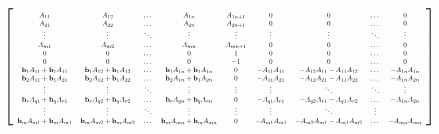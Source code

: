 $\left[
\scalebox{0.5}{%
	\begin{tabular}{ c c c c c c c c c}
	$A_{11}$ & $A_{12}$ & $\dots$ & $A_{1n}$ & $A_{1n+1}$ & $0$ & $0$ & $\dots$ & $0$ \\ 
	$A_{21}$ & $A_{22}$ & $\dots$ & $A_{2n}$ & $A_{2n+1}$ & $0$ & $0$ & $\dots$ & $0$ \\  
	$\vdots$ & $\vdots$ & $\ddots$ & $\vdots$ & $\vdots$ & $\vdots$ & $\vdots$ & $\ddots$ & $\vdots$\\
	$A_{m1}$ & $A_{m2}$ & $\dots$ & $A_{mn}$ & $A_{mn+1}$ & $0$ & $0$ & $\dots$ & $0$ \\
	$0$ & $0$ & $\dots$ & $0$ & $1$ & $0$ & $0$ & $\dots$ & $0$ \\
	$0$ & $0$ & $\dots$ & $0$ & $-1$ & $0$ & $0$ & $\dots$ & $0$ \\
	$\vb_1A_{11}+\vb_1A_{11}$ & $\vb_1A_{12}+\vb_1A_{12}$ & $\dots$ & $\vb_1A_{1n}+\vb_1A_{1n}$ & $0$ & $-A_{11}A_{11}$ & $-A_{12}A_{11}-A_{11}A_{12}$ & $\dots$ & $-A_{1n}A_{1n}$ \\ 
	$\vb_2A_{11}+\vb_1A_{21}$ & $\vb_2A_{12}+\vb_1A_{22}$ & $\dots$ & $\vb_2A_{1n}+\vb_1A_{2n}$ & $0$ & $-A_{11}A_{21}$ & $-A_{12}A_{21}-A_{11}A_{22}$ & $\dots$ & $-A_{1n}A_{2n}$ \\ 
	$\vdots$ & $\vdots$ & $\ddots$ & $\vdots$ & $\vdots$ & $\vdots$ & $\ddots$ & $\ddots$ & $\vdots$\\
	$\vb_rA_{q1}+\vb_qA_{r1}$ & $\vb_rA_{q2}+\vb_qA_{r2}$ & $\dots$ & $\vb_rA_{qn}+\vb_qA_{rn}$ & $0$ &$-A_{q1}A_{r1}$ & $-A_{q2}A_{r1}-A_{q1}A_{r2}$ & $\dots$ & $-A_{1n}A_{2n}$ \\ 
	$\vdots$ & $\vdots$ & $\ddots$ & $\vdots$ & $\vdots$ & $\vdots$ & $\ddots$ & $\vdots$\\
	$\vb_mA_{m1}+\vb_mA_{m1}$ & $\vb_mA_{m2}+\vb_mA_{m2}$ & $\dots$ & $\vb_mA_{mn}+\vb_mA_{mn}$ & $0$ & $-A_{m1}A_{m1}$ & $-A_{m2}A_{m1}-A_{m1}A_{m2}$ & $\dots$ & $-A_{mn}A_{mn}$ 
	\end{tabular}%
} 
\right]$
